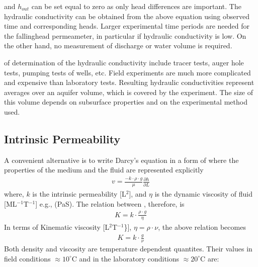 \documentclass[letterpaper,10pt,english]{jupyterBook}
\begin{document}
\sphinxAtStartPar
and \(h_{out}\) can be set equal to zero as only head differences are
important. The hydraulic conductivity can be obtained from the above equation using observed time and corresponding heads. Larger experimental time periods are needed for the falling\sphinxhyphen{}head permeameter, in particular if hydraulic conductivity is low. On the other hand, no measurement of discharge or water volume is required.

\sphinxAtStartPar
{} of determination of the hydraulic conductivity include tracer tests, auger hole tests, pumping tests of wells, etc. Field experiments are much more complicated and expensive than laboratory tests. Resulting hydraulic conductivities represent averages over an aquifer volume, which is covered by the experiment. The size of this
volume depends on subsurface properties and on the experimental method used.


\subsection{Intrinsic Permeability}
\label{\detokenize{content/flow/L4/14_darcy_law_K:intrinsic-permeability}}
\sphinxAtStartPar
A convenient alternative is to write Darcy’s equation in a form of 
where the properties of the medium and the fluid are represented explicitly
\begin{equation*}
\begin{split}
v = \frac{-k \cdot \rho\cdot g}{\mu}\frac{\partial h}{\partial L}
\end{split}
\end{equation*}
\sphinxAtStartPar
where, \(k\) is the intrinsic permeability {[}L\(^2\){]}, and \(\eta\) is the dynamic viscosity of fluid {[}ML\(^{-1}\)T\(^{-1}\){]} e.g., (Pa\sphinxhyphen{}S). The relation between  , therefore, is
\begin{equation*}
\begin{split}
K = k\cdot \frac{ \rho \cdot g}{\eta}
\end{split}
\end{equation*}
\sphinxAtStartPar
In terms of Kinematic viscosity {[}L\(^2\)T\(^{-1}\)\}{]}, \(\eta = \rho \cdot \nu\), the above relation becomes
\begin{equation*}
\begin{split}
K = k\cdot \frac{ g}{\nu}
\end{split}
\end{equation*}
\sphinxAtStartPar
Both density and viscosity are temperature dependent quantites. Their values in field conditions \(\approx 10 ^\circ\)C and in the laboratory conditions \(\approx 20 ^\circ\)C are:
\end{document}
